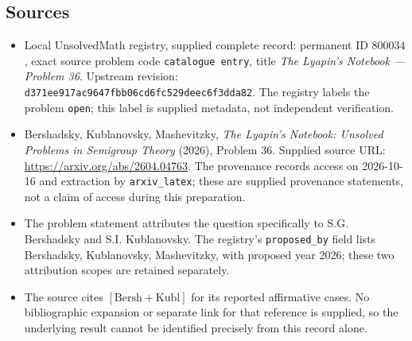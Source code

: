 \documentclass[11pt]{article}
\begin{document}
\subsection{Sources}
\begin{itemize}
\item Local UnsolvedMath registry, supplied complete record: permanent ID \(800034\), exact source problem code \texttt{catalogue entry}, title \emph{The Lyapin's Notebook --- Problem 36}. Upstream revision: \texttt{d371ee917ac9647fbb06cd6fc529deec6f3dda82}. The registry labels the problem \texttt{open}; this label is supplied metadata, not independent verification.
\item Bershadsky, Kublanovsky, Mashevitzky, \emph{The Lyapin's Notebook: Unsolved Problems in Semigroup Theory} (2026), Problem 36. Supplied source URL: \url{https://arxiv.org/abs/2604.04763}. The provenance records access on 2026-10-16 and extraction by \texttt{arxiv\_latex}; these are supplied provenance statements, not a claim of access during this preparation.
\item The problem statement attributes the question specifically to S.G. Bershadsky and S.I. Kublanovsky. The registry's \texttt{proposed\_by} field lists Bershadsky, Kublanovsky, Mashevitzky, with proposed year 2026; these two attribution scopes are retained separately.
\item The source cites \([\mathrm{Bersh+Kubl}]\) for its reported affirmative cases. No bibliographic expansion or separate link for that reference is supplied, so the underlying result cannot be identified precisely from this record alone.
\end{itemize}
\end{document}

